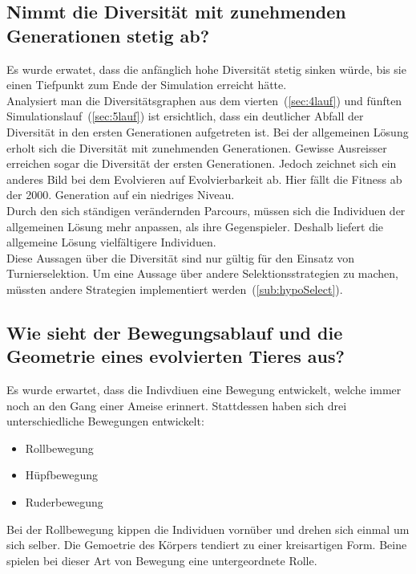     \subsection{Nimmt die Diversität mit zunehmenden Generationen stetig ab?}

      Es wurde erwatet, dass die anfänglich hohe Diversität stetig sinken würde,
      bis sie einen Tiefpunkt zum Ende der Simulation erreicht hätte.
      \\
      Analysiert man die Diversitätsgraphen aus dem vierten~(\vref{sec:4lauf}) und
      fünften Simulationslauf~(\vref{sec:5lauf}) ist ersichtlich,
      dass ein deutlicher Abfall der Diversität in den ersten Generationen aufgetreten ist.
      Bei der allgemeinen Lösung erholt sich die Diversität mit zunehmenden Generationen.
      Gewisse Ausreisser erreichen sogar die Diversität der ersten Generationen.
      Jedoch zeichnet sich ein anderes Bild bei dem Evolvieren auf Evolvierbarkeit ab.
      Hier fällt die Fitness ab der 2000. Generation auf ein niedriges Niveau.
      \\
      Durch den sich ständigen verändernden Parcours,
      müssen sich die Individuen der allgemeinen Lösung mehr anpassen, als ihre Gegenspieler.
      Deshalb liefert die allgemeine Lösung vielfältigere Individuen.
      \\
      Diese Aussagen über die Diversität sind nur gültig für den Einsatz von Turnierselektion.
      Um eine Aussage über andere Selektionsstrategien zu machen,
      müssten andere Strategien implementiert werden~(\vref{sub:hypoSelect}).

    \subsection{Wie sieht der Bewegungsablauf und die Geometrie eines evolvierten Tieres aus?}

      Es wurde erwartet, dass die Indivdiuen eine Bewegung entwickelt,
      welche immer noch an den Gang einer Ameise erinnert.
      Stattdessen haben sich drei unterschiedliche Bewegungen entwickelt:

      \begin{itemize}
        \item Rollbewegung
        \item Hüpfbewegung
        \item Ruderbewegung
      \end{itemize}

      Bei der Rollbewegung kippen die Individuen vornüber und drehen sich einmal um sich selber.
      Die Gemoetrie des Körpers tendiert zu einer kreisartigen Form.
      Beine spielen bei dieser Art von Bewegung eine untergeordnete Rolle.

